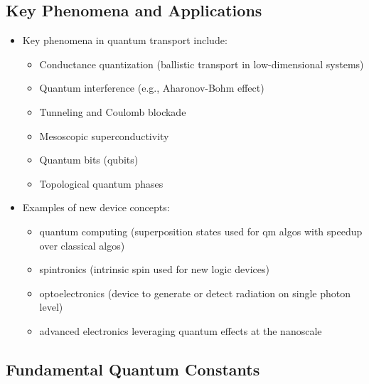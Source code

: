 \subsection{Key Phenomena and Applications}

\begin{itemize}
    \item Key phenomena in quantum transport include:
          \begin{itemize}
              \item Conductance quantization (ballistic transport in low-dimensional systems)
              \item Quantum interference (e.g., Aharonov-Bohm effect)
              \item Tunneling and Coulomb blockade
              \item Mesoscopic superconductivity
              \item Quantum bits (qubits)
              \item Topological quantum phases
          \end{itemize}
    \item Examples of new device concepts:
          \begin{itemize}
              \item quantum computing (superposition states used for qm algos with speedup over classical algos)
              \item spintronics (intrinsic spin used for new logic devices)
              \item optoelectronics (device to generate or detect radiation on single photon level)
              \item advanced electronics leveraging quantum effects at the nanoscale
          \end{itemize}
\end{itemize}

\subsection{Fundamental Quantum Constants}

